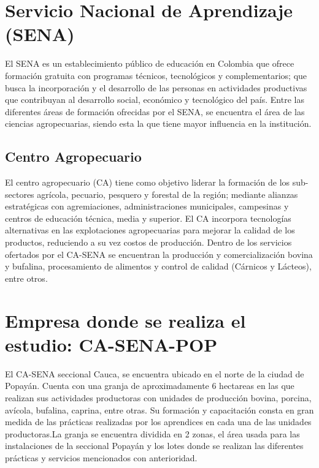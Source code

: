
\section{Servicio Nacional de Aprendizaje (SENA)}

El SENA es un establecimiento público de educación en Colombia que ofrece formación gratuita con programas técnicos, tecnológicos y complementarios; que busca la incorporación y el desarrollo de las personas en actividades productivas que contribuyan al desarrollo social, económico y tecnológico del país. Entre las diferentes áreas de formación ofrecidas por el SENA, se encuentra el área de las ciencias agropecuarias, siendo esta la que tiene mayor influencia en la institución.\cite{sena}


\subsection{Centro Agropecuario}

El centro agropecuario (CA) tiene como objetivo liderar la formación de los sub-sectores agrícola, pecuario, pesquero y forestal de la región; mediante alianzas estratégicas con agremiaciones, administraciones municipales, campesinas y centros de educación técnica, media y superior. El CA incorpora tecnologías alternativas en las explotaciones agropecuarias para mejorar la calidad de los productos, reduciendo a su vez costos de producción. Dentro de los servicios ofertados por el CA-SENA se encuentran la producción y comercialización bovina y bufalina, procesamiento de alimentos y control de calidad (Cárnicos y Lácteos), entre otros\cite{casena}.

\section{Empresa donde se realiza el estudio: CA-SENA-POP}

El CA-SENA seccional Cauca, se encuentra ubicado en el norte de la ciudad de Popayán. Cuenta con una granja de aproximadamente 6 hectareas en las que realizan sus actividades productoras con unidades de producción bovina, porcina, avícola, bufalina, caprina, entre otras. Su formación y capacitación consta en gran medida de las prácticas realizadas por los aprendices en cada una de las unidades productoras.La granja se encuentra dividida en 2 zonas, el área usada para las instalaciones de la seccional Popayán y los lotes donde se realizan las diferentes prácticas y servicios mencionados con anterioridad.\\

